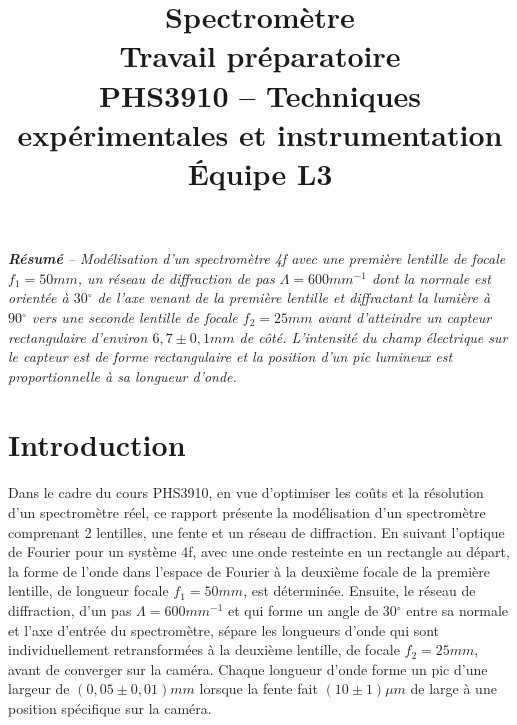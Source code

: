 \documentclass[conference]{IEEEtran}
\begin{document}
\title{Spectromètre\\
\large Travail préparatoire \\
PHS3910 -- Techniques expérimentales et instrumentation\\ 
Équipe L3}

\author{
\and
{}
\and
{}
\and
{}
}

\maketitle

\textit{\textbf{Résumé} -- Modélisation d'un spectromètre 4f avec une première lentille
de focale $f_1=50mm$, un réseau de diffraction de pas $\Lambda=600mm^{-1}$ dont la normale
est orientée à 
$30{^\circ}$ de l'axe venant de la première lentille et diffractant la lumière à 
$90{^\circ}$ vers une seconde lentille de focale $f_2=25mm$ avant d'atteindre un capteur
rectangulaire d'environ $6,7\pm0,1 mm$ de côté. L'intensité du champ électrique 
sur le capteur est de forme rectangulaire et la position d'un pic lumineux est 
proportionnelle à sa longueur d'onde.}

\section{Introduction}
Dans le cadre du cours PHS3910, en vue d'optimiser les coûts et la résolution d'un spectromètre réel,
ce rapport présente la modélisation d'un spectromètre comprenant 2 lentilles, une fente et un réseau de diffraction. 
En suivant l'optique de Fourier pour un système 4f, avec une onde resteinte en un rectangle au départ,
la forme de l'onde dans l'espace de Fourier à la deuxième focale de la première
lentille, de longueur focale $f_1=50mm$, est déterminée. Ensuite, le réseau de diffraction, d'un pas $\Lambda=600mm^{-1}$ 
et qui forme un angle de $30{^\circ}$ entre sa normale et
l'axe d'entrée du spectromètre, sépare les longueurs d'onde qui 
sont individuellement retransformées à la deuxième lentille, de focale $f_2=25mm$, avant de converger sur la caméra.
Chaque longueur d'onde forme un pic d'une largeur de $(0,05\pm 0,01)mm$ lorsque la fente fait $(10\pm 1) \mu m$
de large à une position spécifique sur la caméra.
\end{document}
